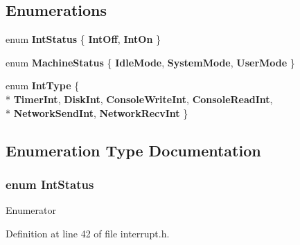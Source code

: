 \subsection*{Enumerations}
\begin{DoxyCompactItemize}
\item 
enum {\bf Int\+Status} \{ {\bf Int\+Off}, 
{\bf Int\+On}
 \}
\item 
enum {\bf Machine\+Status} \{ {\bf Idle\+Mode}, 
{\bf System\+Mode}, 
{\bf User\+Mode}
 \}
\item 
enum {\bf Int\+Type} \{ \\*
{\bf Timer\+Int}, 
{\bf Disk\+Int}, 
{\bf Console\+Write\+Int}, 
{\bf Console\+Read\+Int}, 
\\*
{\bf Network\+Send\+Int}, 
{\bf Network\+Recv\+Int}
 \}
\end{DoxyCompactItemize}


\subsection{Enumeration Type Documentation}
\subsubsection[{Int\+Status}]{\setlength{\rightskip}{0pt plus 5cm}enum {\bf Int\+Status}}\label{interrupt_8h_a9a61b6bd5154e67f1a6a0b1f2d4ac202}
\begin{Desc}
\item[Enumerator]\par
\begin{description}
\item[{\em 
Int\+Off\label{interrupt_8h_a9a61b6bd5154e67f1a6a0b1f2d4ac202acb7e3ccd96cfa9f1efea972c0ab368cf}
}]\item[{\em 
Int\+On\label{interrupt_8h_a9a61b6bd5154e67f1a6a0b1f2d4ac202a358ab51a1e991c30a150f8eac0c8d190}
}]\end{description}
\end{Desc}


Definition at line 42 of file interrupt.\+h.

